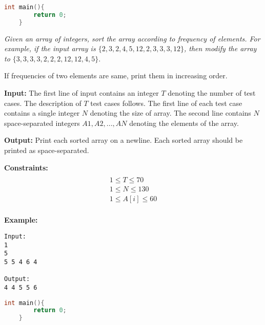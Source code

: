 \begin{solution}
\begin{lstlisting}[language=C++, caption="C++ Solution"]
	int main(){
		return 0;	
	}
\end{lstlisting}

\end{solution}


\begin{problem}
\textit{Given an array of integers, sort the array according to frequency of elements. For example, if the input array is $\{2, 3, 2, 4, 5, 12, 2, 3, 3, 3, 12\}$, then modify the array to $\{3, 3, 3, 3, 2, 2, 2, 12, 12, 4, 5\}$}. 

If frequencies of two elements are same, print them in increasing order.

\textbf{Input:}
The first line of input contains an integer $T$ denoting the number of test cases. The description of $T$ test cases follows. The first line of each test case contains a single integer $N$ denoting the size of array. The second line contains $N$ space-separated integers $A1, A2, ..., AN$ denoting the elements of the array.

\textbf{Output:}
Print each sorted array on a newline. Each sorted array should be printed as space-separated.

\textbf{Constraints:}
\begin{multline}\\
1 \leq T \leq 70\\
1 \leq N \leq 130\\
1 \leq A[i] \leq 60\\
\end{multline}

\textbf{Example:}
\begin{verbatim}
Input:
1
5
5 5 4 6 4

Output:
4 4 5 5 6 

\end{verbatim}

\end{problem}

\begin{solution}
\begin{lstlisting}[language=C++, caption="C++ Solution"]
	int main(){
		return 0;	
	}
\end{lstlisting}

\end{solution}

